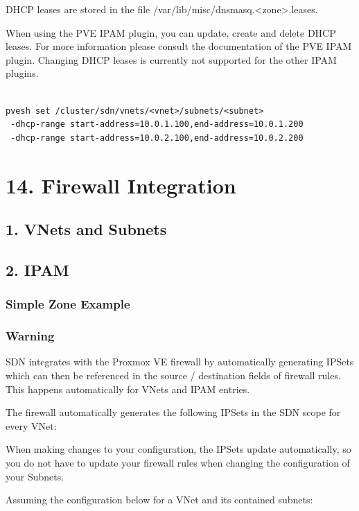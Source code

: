 DHCP leases are stored in the file /var/lib/misc/dnsmasq.<zone>.leases.

When using the PVE IPAM plugin, you can update, create and delete DHCP leases. For more information please consult the documentation of the PVE IPAM plugin. Changing DHCP leases is currently not supported for the other IPAM plugins.

\begin{lstlisting}

pvesh set /cluster/sdn/vnets/<vnet>/subnets/<subnet>
 -dhcp-range start-address=10.0.1.100,end-address=10.0.1.200
 -dhcp-range start-address=10.0.2.100,end-address=10.0.2.200

\end{lstlisting}


\section{14. Firewall Integration}

\subsection{1. VNets and Subnets}

\subsection{2. IPAM}

\subsubsection{Simple Zone Example}

\subsubsection{Warning}

SDN integrates with the Proxmox VE firewall by automatically generating IPSets which can then be referenced in the source / destination fields of firewall rules. This happens automatically for VNets and IPAM entries.

The firewall automatically generates the following IPSets in the SDN scope for every VNet:

When making changes to your configuration, the IPSets update automatically, so you do not have to update your firewall rules when changing the configuration of your Subnets.

Assuming the configuration below for a VNet and its contained subnets:

